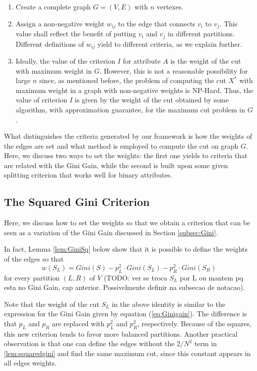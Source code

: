 \begin{enumerate}
\item  Create a complete graph $G=(V,E)$ with $n$ vertexes.

\item  Assign a non-negative weight $w_{ij}$ to the edge 
that connects $v_i$ to $v_j$. This value shall reflect the benefit of putting  $v_i$ and $v_j$ in different partitions.
Different definitions of $w_{ij}$ yield to different criteria,
as we explain further.

\item  Ideally, the value of the criterion $I$ for attribute
$A$ is the weight of the cut with maximum weight  in $G$.
However, this is not a reasonable possibility for large $n$ since, as mentioned before, the problem of computing the  cut $X^*$ with maximum weight in a graph with non-negative weights is NP-Hard.
Thus, the value of criterion $I$ is given by the weight
of the cut obtained by some  algorithm, with approximation guarantee, for the maximum cut
problem in $G$.   
\end{enumerate}

What distinguishes the  criteria
generated  by our framework
is how the weights of the edges are set and what 
method is employed to compute the cut on graph $G$.
Here, we discuss two ways to set the weights:
the first one yields to criteria that
are related with the Gini Gain, while the second 
is built upon some given splitting  criterion that works well for binary attributes.


\subsection{The Squared Gini Criterion}
Here, we discuss how to set the weights so that we obtain 
a criterion that can be seen as a variation of the Gini Gain discussed in Section \ref{subsec:Gini}.

In fact, Lemma \ref{lem:GiniSq} below  show that  it is possible to define the
weights of the edges so that 
\begin{equation}
 \label{lem:squaredgini}
w(S_L)= Gini(S) - p^2_L \cdot Gini(S_L) - p^2_R \cdot Gini(S_R) 
\end{equation}
for every partition $(L,R)$ of $V$ (TODO: ver se troca $S_L$ por L ou mantem pq esta no Gini Gain, cap anterior. Possivelmente definir na subsecao de notacao). 

Note that the weight of the cut  $S_L$ in the above identity 
is similar to the expression for the Gini Gain given by equation (\ref{eq:Ginigain}).
The difference is that $p_L$ and $p_R$ are replaced with
$p_L^2$ and $p_R^2$, respectively. Because of the squares, this new criterion tends to favor more balanced partitions. Another practical observation is that one can define the edges without the $2/N^2$ term in \ref{lem:squaredgini} and find the same maximum cut, since this constant appears in all edges weights.


